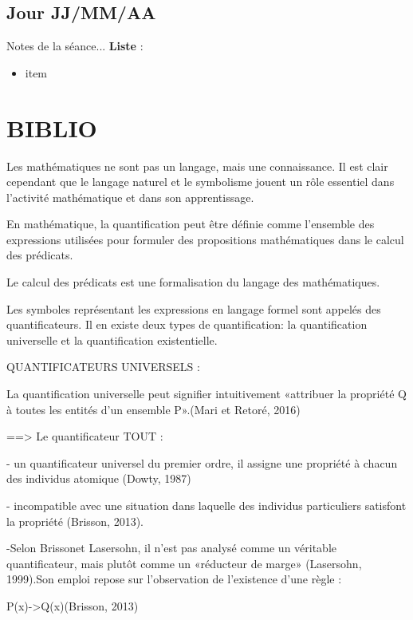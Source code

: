 \documentclass[11pt,letterpaper]{article}
\begin{document}
\newpage
\subsection{Jour JJ/MM/AA}
Notes de la séance... \vspace{5mm}
\textbf{Liste} :
\begin{itemize}
    \item item
\end{itemize} \vspace{5mm}
\newpage

\section{BIBLIO}
\par Les mathématiques ne sont pas un langage, mais une connaissance. Il est clair
cependant que le langage naturel et le symbolisme jouent un rôle essentiel dans
l’activité mathématique et dans son apprentissage.

\vspace{5mm}
\par En mathématique, la quantification peut être définie comme l’ensemble des expressions utilisées pour formuler des propositions mathématiques dans le calcul des prédicats.

\vspace{5mm}
Le calcul des prédicats est une formalisation du langage des mathématiques.
\par Les symboles représentant les expressions en langage formel sont appelés des quantificateurs. Il en existe  deux types  de  quantification:  la quantification universelle et  la  quantification existentielle.

\vspace{5mm}
QUANTIFICATEURS UNIVERSELS :
\par La  quantification  universelle  peut  signifier  intuitivement  «attribuer  la  propriété  Q  à  toutes  les entités d’un ensemble P».(Mari et Retoré,  2016)
\par ==>  Le quantificateur TOUT :\par
- un  quantificateur  universel  du  premier  ordre,  il  assigne  une  propriété  à  chacun  des individus atomique (Dowty, 1987)\par
- incompatible avec une situation dans laquelle des individus particuliers satisfont la propriété (Brisson, 2013).\par
-Selon Brissonet Lasersohn, il n’est pas analysé comme un véritable quantificateur, mais plutôt comme un «réducteur de marge» (Lasersohn, 1999).Son emploi repose sur l’observation de l’existence d’une règle :\par         P(x)->Q(x)(Brisson, 2013)
\end{document}

